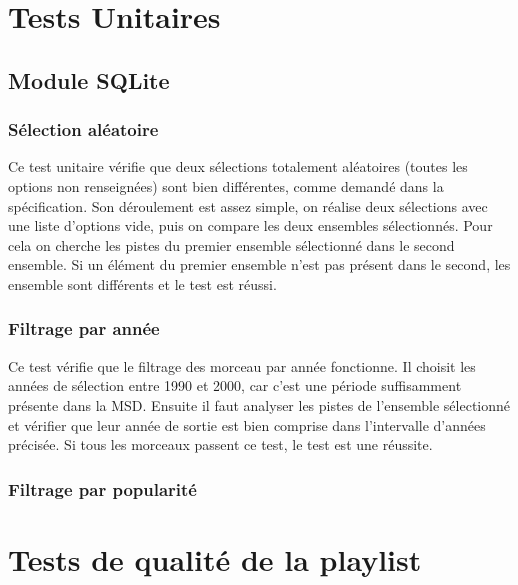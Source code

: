 
\section{Tests Unitaires}
\label{tests:unitaires}

\subsection{Module SQLite}
\label{tests:unitaires:sqlite}

\subsubsection{Sélection aléatoire}
\label{tests:unitaires:sqlite:random}

Ce test unitaire vérifie que deux sélections totalement aléatoires (toutes les
options non renseignées) sont bien différentes, comme demandé dans la
spécification. Son déroulement est assez simple, on réalise deux sélections avec
une liste d'options vide, puis on compare les deux ensembles sélectionnés.
Pour cela on cherche les pistes du premier ensemble sélectionné dans le second
ensemble. Si un élément du premier ensemble n'est pas présent dans le second,
les ensemble sont différents et le test est réussi.

\subsubsection{Filtrage par année}
\label{tests:unitaires:sqlite:annee}

Ce test vérifie que le filtrage des morceau par année fonctionne. Il choisit les
années de sélection entre 1990 et 2000, car c'est une période suffisamment
présente dans la MSD. Ensuite il faut analyser les pistes de l'ensemble
sélectionné et vérifier que leur année de sortie est bien comprise dans
l'intervalle d'années précisée. Si tous les morceaux passent ce test, le test
est une réussite.

\subsubsection{Filtrage par popularité}
\label{tests:unitaires:sqlite:popularite}


\section{Tests de qualité de la playlist}
\label{tests:qualite}

